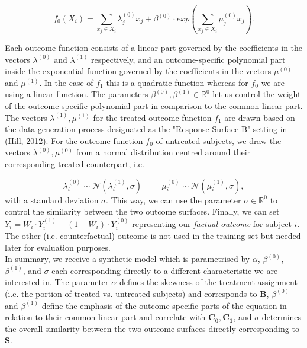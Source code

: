 \begin{equation}
f_0(X_i) = \sum \limits_{{x_{j} \in X_i}} \lambda^{(0)}_j x_j +  \beta^{(0)} \cdot exp(\sum \limits_{{x_{j} \in X_i}} \mu^{(0)}_j x_j).
\end{equation}

Each outcome function consists of a linear part governed by the coefficients in the vectors $\lambda^{(0)}$ and $\lambda^{(1)}$ respectively, and an outcome-specific polynomial part inside the exponential function governed by the coefficients in the vectors $\mu^{(0)}$ and $\mu^{(1)}$. In the case of $f_1$ this is a quadratic function whereas for $f_0$ we are using a linear function. The parameters $\beta^{(0)}, \beta^{(1)} \in \mathbb{R}^0$ let us control the weight of the outcome-specific polynomial part in comparison to the common linear part. \\

The vectors $\lambda^{(1)}, \mu^{(1)}$ for the treated outcome function $f_1$ are drawn based on the data generation process designated as the "Response Surface B" setting in (Hill, 2012). For the outcome function $f_0$ of untreated subjects, we draw the vectors $\lambda^{(0)}, \mu^{(0)}$ from a normal distribution centred around their corresponding treated counterpart, i.e.    


\begin{equation}
\lambda^{(0)}_i \sim \mathcal{N}(\lambda^{(1)}_i, \sigma)  \hspace{1cm} \mu^{(0)}_i \sim \mathcal{N}(\mu^{(1)}_i, \sigma),
\end{equation}
with a standard deviation $\sigma$. This way, we can use the parameter $\sigma \in \mathbb{R}^0$ to control the similarity between the two outcome surfaces. 
Finally, we can set $Y_i = W_i \cdot Y^{(1)}_i + (1 - W_i) \cdot Y^{(0)}_i$ representing our \emph{factual outcome} for subject $i$. The other (i.e. counterfactual) outcome is not used in the training set but needed later for evaluation purposes. \\

In summary, we receive a synthetic model which is parametrised by $\alpha$, $\beta^{(0)}$, $\beta^{(1)}$, and $\sigma$ each corresponding directly to a different characteristic we are interested in. The parameter $\alpha$ defines the skewness of the treatment assignment (i.e. the portion of treated vs. untreated subjects) and corresponds to $\mathbf{B}$,  $\beta^{(0)}$ and $\beta^{(1)}$ define the emphasis of the outcome-specific parts of the equation in relation to their common linear part and correlate with $\mathbf{C_0}, \mathbf{C_1}$, and $\sigma$ determines the overall similarity between the two outcome surfaces directly corresponding to $\mathbf{S}$. 

